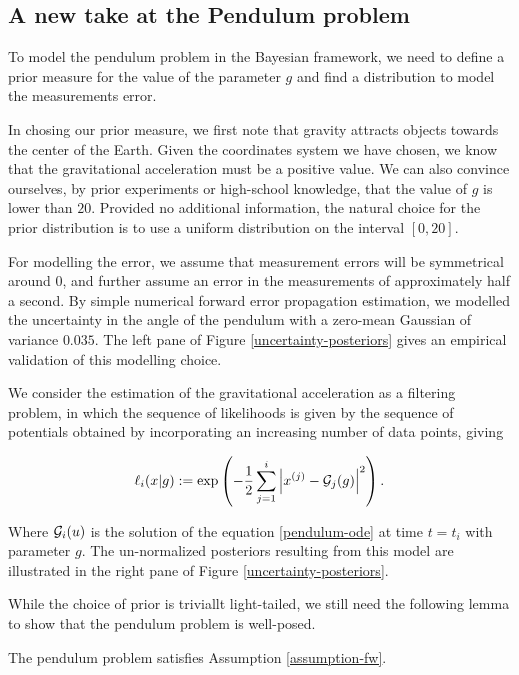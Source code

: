 
\subsection{A new take at the Pendulum problem}

To model the pendulum problem in the Bayesian framework, we need to define a prior measure for the value of the parameter $g$ and find a distribution to model the measurements error.

In chosing our prior measure, we first note that gravity attracts objects towards the center of the Earth. Given the coordinates system we have chosen, we know that the gravitational acceleration must be a positive value. We can also convince ourselves, by prior experiments or high-school knowledge, that the value of $g$ is lower than $20$. Provided no additional information, the natural choice for the prior distribution is to use a uniform distribution on the interval $[0, 20]$.

For modelling the error, we assume that measurement errors will be symmetrical around $0$, and further assume an error in the measurements of approximately half a second. By simple numerical forward error propagation estimation, we modelled the uncertainty in the angle of the pendulum with a zero-mean Gaussian of variance $0.035$. The left pane of Figure \ref{uncertainty-posteriors} gives an empirical validation of this modelling choice.

We consider the estimation of the gravitational acceleration as a filtering problem, in which the sequence of likelihoods is given by the sequence of potentials obtained by incorporating an increasing number of data points, giving

\begin{equation*}
  \ell_i(x|g) := \exp\left(-\frac12\sum_{j=1}^i\left|x^{(j)} - \mathcal{G}_j(g)\right|^2\right).
\end{equation*}

Where $\mathcal{G}_i(u)$ is the solution of the equation \ref{pendulum-ode} at time $t = t_i$ with parameter $g$. The un-normalized posteriors resulting from this model are illustrated in the right pane of Figure \ref{uncertainty-posteriors}.

While the choice of prior is triviallt light-tailed, we still need the following lemma to show that the pendulum problem is well-posed.

\begin{lemma} The pendulum problem satisfies Assumption \ref{assumption-fw}.
\end{lemma}


